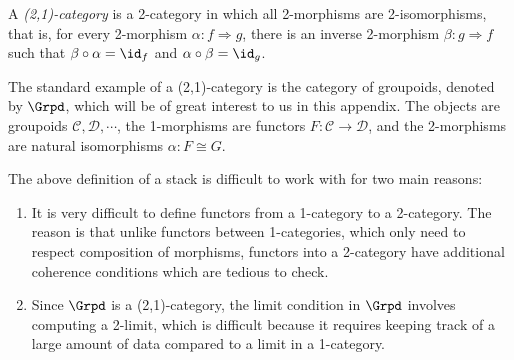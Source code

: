 \begin{definition}[(2,1)-category]
    A \emph{(2,1)-category} is a 2-category in which all 2-morphisms are 2-isomorphisms, that is, for every 2-morphism $\alpha: f \Rightarrow g$, there is an inverse 2-morphism $\beta: g \Rightarrow f$ such that $\beta \circ \alpha = \id_f$ and $\alpha \circ \beta = \id_g$.
\end{definition}

\begin{example}
    The standard example of a (2,1)-category is the category of groupoids, denoted by $\Grpd$, which will be of great interest to us in this appendix. The objects are groupoids $\mathcal{C}, \mathcal{D}, \cdots$, the 1-morphisms are functors $F: \mathcal{C}\to \mathcal{D}$, and the 2-morphisms are natural isomorphisms $\alpha: F \cong G$. 
\end{example}

\begin{remark}
    The above definition of a stack is difficult to work with for two main reasons:
    \begin{enumerate}
        \item It is very difficult to define functors from a 1-category to a 2-category. The reason is that unlike functors between 1-categories, which only need to respect composition of morphisms, functors into a 2-category have additional coherence conditions which are tedious to check.
        \item Since $\Grpd$ is a (2,1)-category, the limit condition in $\Grpd$ involves computing a 2-limit, which is difficult because it requires keeping track of a  large amount of data compared to a limit in a 1-category.
    \end{enumerate}
\end{remark}

